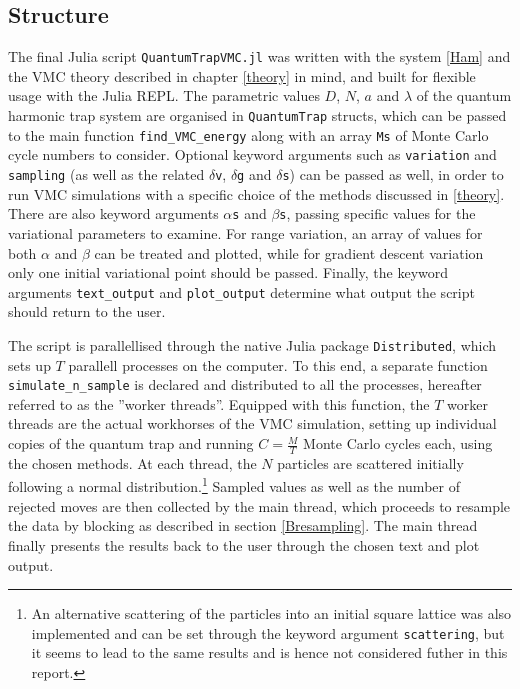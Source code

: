 \documentclass[a4paper,8pt]{article}
\begin{document}
\begin{multicols}{2}
\subsection{Structure}\label{structure}
The final Julia script \texttt{QuantumTrapVMC.jl} was written with the system \eqref{Ham} and the VMC theory described in chapter \ref{theory} in mind, and built for flexible usage with the Julia REPL.  The parametric values $D$, $N$, $a$ and $\lambda$ of the quantum harmonic trap system are organised in \texttt{QuantumTrap} structs, which can be passed to the main function \texttt{find\_VMC\_energy} along with an array \texttt{Ms} of Monte Carlo cycle numbers to consider. Optional keyword arguments such as \texttt{variation} and \texttt{sampling} (as well as the related \texttt{$\delta$v}, \texttt{$\delta$g} and \texttt{$\delta$s}) can be passed as well, in order to run VMC simulations with a specific choice of the methods discussed in \ref{theory}. There are also keyword arguments \texttt{$\alpha$s} and \texttt{$\beta$s}, passing specific values for the variational parameters to examine. For range variation, an array of values for both $\alpha$ and $\beta$ can be treated and plotted, while for gradient descent variation only one initial variational point should be passed. Finally, the keyword arguments \texttt{text\_output} and \texttt{plot\_output} determine what output the script should return to the user.

The script is parallellised through the native Julia package \texttt{Distributed}, which sets up $T$ parallell processes on the computer. To this end, a separate function \texttt{simulate\_n\_sample} is declared and distributed to all the processes, hereafter referred to as the ''worker threads''. Equipped with this function, the $T$ worker threads are the actual workhorses of the VMC simulation, setting up individual copies of the quantum trap and running $C = \frac{M}{T}$ Monte Carlo cycles each, using the chosen methods. At each thread, the $N$ particles are scattered initially following a normal distribution.\footnote{An alternative scattering of the particles into an initial square lattice was also implemented and can be set through the keyword argument \texttt{scattering}, but it seems to lead to the same results and is hence not considered futher in this report.} Sampled values as well as the number of rejected moves are then collected by the main thread, which proceeds to resample the data by blocking as described in section \ref{Bresampling}. The main thread finally presents the results back to the user through the chosen text and plot output.


\end{multicols}
\end{document}
